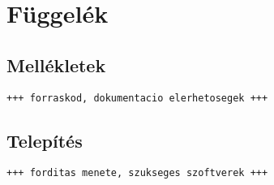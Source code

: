 \appendix
\chapter*{Függelék}
\setcounter{chapter}{6}  %
\setcounter{equation}{0} %
\setcounter{footnote}{0}

\section{Mellékletek}\label{sect:mellekletek}

\texttt{+++ forraskod, dokumentacio elerhetosegek +++}



\section{Telepítés}\label{sect:telepites}

\texttt{+++ forditas menete, szukseges szoftverek +++}




